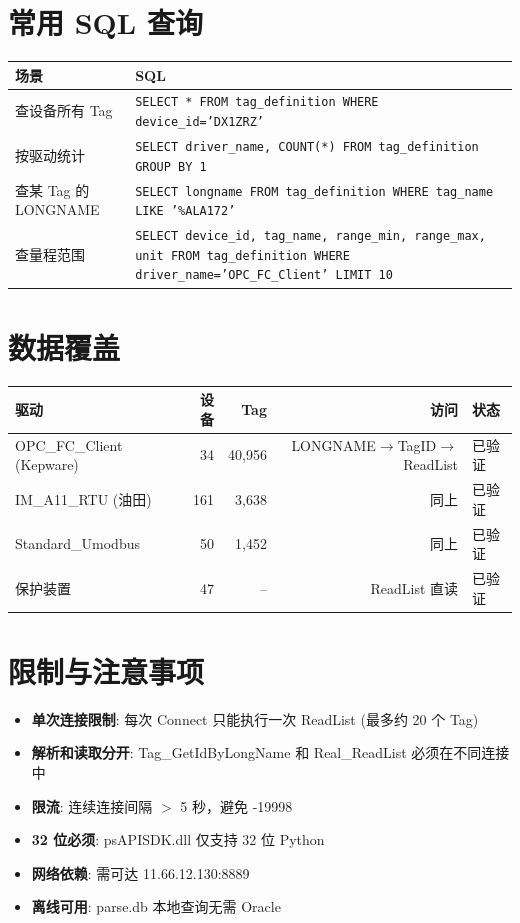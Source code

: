 \documentclass[12pt,a4paper]{ctexart}
\begin{document}
\section{常用 SQL 查询}

\begin{table}[H]\centering
\begin{tabular}{lp{8cm}}
\toprule
\textbf{场景} & \textbf{SQL} \\
\midrule
查设备所有 Tag & \texttt{SELECT * FROM tag\_definition WHERE device\_id='DX1ZRZ'} \\
按驱动统计 & \texttt{SELECT driver\_name, COUNT(*) FROM tag\_definition GROUP BY 1} \\
查某 Tag 的 LONGNAME & \texttt{SELECT longname FROM tag\_definition WHERE tag\_name LIKE '\%ALA172'} \\
查量程范围 & \texttt{SELECT device\_id, tag\_name, range\_min, range\_max, unit FROM tag\_definition WHERE driver\_name='OPC\_FC\_Client' LIMIT 10} \\
\bottomrule
\end{tabular}
\end{table}

\section{数据覆盖}

\begin{table}[H]\centering
\begin{tabular}{lrrrl}
\toprule
\textbf{驱动} & \textbf{设备} & \textbf{Tag} & \textbf{访问} & \textbf{状态} \\
\midrule
OPC\_FC\_Client (Kepware) & 34 & 40,956 & LONGNAME$\to$TagID$\to$ReadList & 已验证 \\
IM\_A11\_RTU (油田) & 161 & 3,638 & 同上 & 已验证 \\
Standard\_Umodbus & 50 & 1,452 & 同上 & 已验证 \\
保护装置 & 47 & -- & ReadList 直读 & 已验证 \\
\bottomrule
\end{tabular}
\end{table}

\section{限制与注意事项}

\begin{itemize}[leftmargin=*]
  \item \textbf{单次连接限制}: 每次 Connect 只能执行一次 ReadList (最多约 20 个 Tag)
  \item \textbf{解析和读取分开}: Tag\_GetIdByLongName 和 Real\_ReadList 必须在不同连接中
  \item \textbf{限流}: 连续连接间隔 $>$ 5 秒，避免 -19998
  \item \textbf{32 位必须}: psAPISDK.dll 仅支持 32 位 Python
  \item \textbf{网络依赖}: 需可达 11.66.12.130:8889
  \item \textbf{离线可用}: parse.db 本地查询无需 Oracle
\end{itemize}
\end{document}

